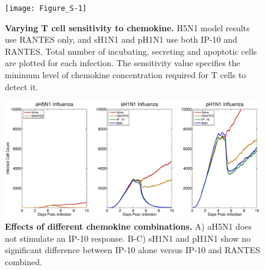 \documentclass[10pt]{article}
\begin{document}


\setcounter{figure}{0}
\renewcommand{\thefigure}{S\arabic{figure}}


\begin{figure}[!ht]
\begin{center}
 \texttt{[image: Figure\_S-1]}
 \end{center}
\caption{{\bf Varying T cell sensitivity to chemokine.}  H5N1 model results use RANTES  only, and sH1N1 and pH1N1 use both IP-10 and RANTES. Total number of incubating, secreting and apoptotic cells are plotted for each infection.  The sensitivity value specifies the minimum level of chemokine concentration required for T cells to detect it. } 
 \label{fig:sensitivity}
\end{figure}


\begin{figure}[ht!]
\begin{center}
	\includegraphics[width=\textwidth]{Figure_S2}
	\caption{\textbf{Effects of different chemokine combinations.}  A) aH5N1 does not stimulate an IP-10 response.  B-C) sH1N1 and pH1N1 show no significant difference between IP-10 alone versus IP-10 and RANTES combined.}
	\label{fig:chemokine}
\end{center}
\end{figure}
\end{document}
